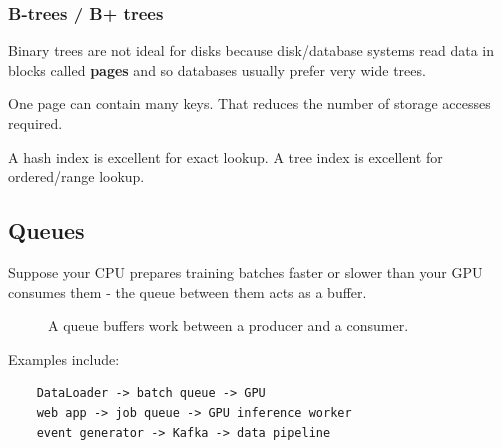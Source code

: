 
\subsubsection{B-trees / B+ trees}
Binary trees are not ideal for disks because disk/database systems read data in blocks called \textbf{pages} and so databases usually prefer very wide trees.
\begin{center}
\end{center}

One page can contain many keys.
That reduces the number of storage accesses required.



\begin{calloutpracticaltip}
    A hash index is excellent for exact lookup.
    A tree index is excellent for ordered/range lookup.
\end{calloutpracticaltip}


\subsection{Queues}
\label{subsec:queues}

Suppose your CPU prepares training batches faster or slower than your GPU consumes them - the queue between them acts as a buffer.

\begin{figure}[htbp]
    \centering
    \caption{A queue buffers work between a producer and a consumer.}
    \label{fig:producer-consumer-queue}
    \end{figure}
    Examples include:
    \begin{verbatim}
    DataLoader -> batch queue -> GPU
    web app -> job queue -> GPU inference worker
    event generator -> Kafka -> data pipeline
\end{verbatim}

